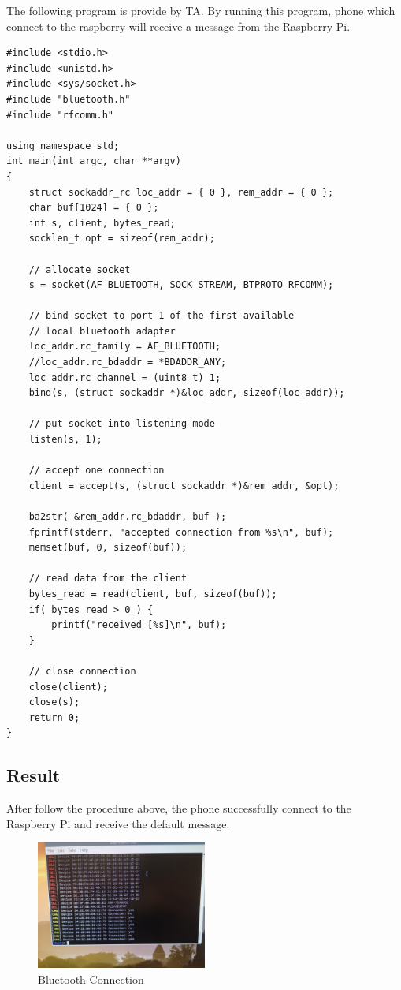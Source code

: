 \documentclass{article}
\begin{document}
The following program is provide by TA. By running this program, phone which connect to the raspberry will receive a message from the Raspberry Pi.
\begin{lstlisting}
#include <stdio.h>
#include <unistd.h>
#include <sys/socket.h>
#include "bluetooth.h"
#include "rfcomm.h"

using namespace std;
int main(int argc, char **argv)
{
	struct sockaddr_rc loc_addr = { 0 }, rem_addr = { 0 };
	char buf[1024] = { 0 };
	int s, client, bytes_read;
	socklen_t opt = sizeof(rem_addr);
	
	// allocate socket
	s = socket(AF_BLUETOOTH, SOCK_STREAM, BTPROTO_RFCOMM);
	
	// bind socket to port 1 of the first available 
	// local bluetooth adapter
	loc_addr.rc_family = AF_BLUETOOTH;
	//loc_addr.rc_bdaddr = *BDADDR_ANY;
	loc_addr.rc_channel = (uint8_t) 1;
	bind(s, (struct sockaddr *)&loc_addr, sizeof(loc_addr));
	
	// put socket into listening mode
	listen(s, 1);
	
	// accept one connection
	client = accept(s, (struct sockaddr *)&rem_addr, &opt);
	
	ba2str( &rem_addr.rc_bdaddr, buf );
	fprintf(stderr, "accepted connection from %s\n", buf);
	memset(buf, 0, sizeof(buf));
	
	// read data from the client
	bytes_read = read(client, buf, sizeof(buf));
	if( bytes_read > 0 ) {
		printf("received [%s]\n", buf);
	}
	
	// close connection
	close(client);
	close(s);
	return 0;
}
\end{lstlisting}
\clearpage
\subsection{Result}
After follow the procedure above, the phone successfully connect to the Raspberry Pi and receive the default message.
\begin{figure}[hb]
	\centering
	\includegraphics[width=0.5\textwidth]{img/Lab03_12.jpg}
	\caption{Bluetooth Connection} 
	\label{BBD}
\end{figure}
\clearpage
\end{document}
